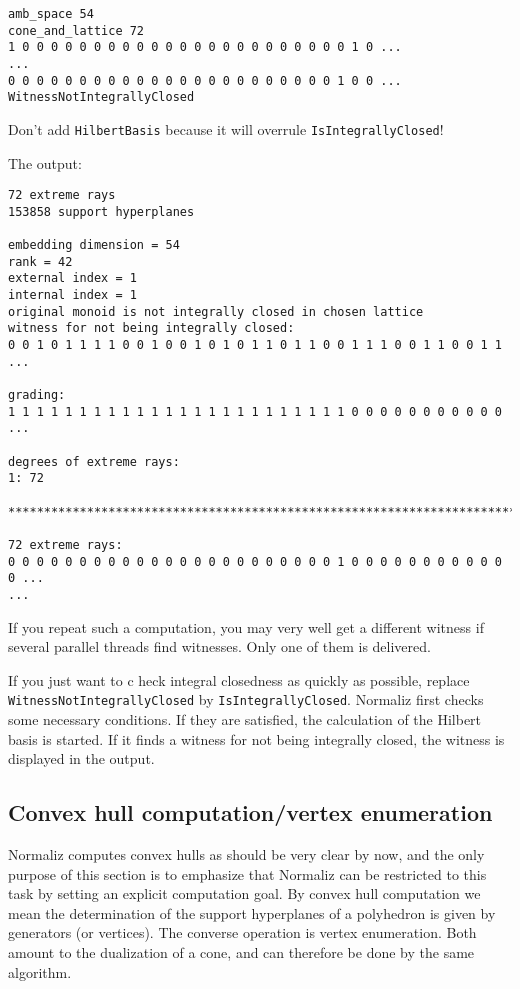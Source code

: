 \documentclass[12pt,a4paper]{scrartcl}
\theoremstyle{definition}
\begin{document}
\begin{Verbatim}
amb_space 54
cone_and_lattice 72
1 0 0 0 0 0 0 0 0 0 0 0 0 0 0 0 0 0 0 0 0 0 0 0 1 0 ...
...
0 0 0 0 0 0 0 0 0 0 0 0 0 0 0 0 0 0 0 0 0 0 0 1 0 0 ...
WitnessNotIntegrallyClosed
\end{Verbatim}
Don't add \verb|HilbertBasis| because it will overrule \verb|IsIntegrallyClosed|!

The output:
\begin{Verbatim}
72 extreme rays
153858 support hyperplanes

embedding dimension = 54
rank = 42
external index = 1
internal index = 1
original monoid is not integrally closed in chosen lattice
witness for not being integrally closed:
0 0 1 0 1 1 1 1 0 0 1 0 0 1 0 1 0 1 1 0 1 1 0 0 1 1 1 0 0 1 1 0 0 1 1 ...

grading:
1 1 1 1 1 1 1 1 1 1 1 1 1 1 1 1 1 1 1 1 1 1 1 1 0 0 0 0 0 0 0 0 0 0 0 ...

degrees of extreme rays:
1: 72  

***********************************************************************

72 extreme rays:
0 0 0 0 0 0 0 0 0 0 0 0 0 0 0 0 0 0 0 0 0 0 0 1 0 0 0 0 0 0 0 0 0 0 0 0 ...
...
\end{Verbatim}

If you repeat such a computation, you may very well get a different witness if several parallel threads find witnesses. Only one of them is delivered.

If you just want to c heck integral closedness as quickly as possible, replace \verb|WitnessNotIntegrallyClosed| by \verb|IsIntegrallyClosed|. Normaliz first checks some necessary conditions. If they are satisfied, the calculation of the Hilbert basis is started. If it finds a witness for not being integrally closed, the witness is displayed in the output.
\subsection{Convex hull computation/vertex enumeration}

Normaliz computes convex hulls as should be very clear by now, and the only purpose of this section is to emphasize that Normaliz can be restricted to this task by setting an explicit computation goal. By convex hull computation we mean the determination of the support hyperplanes of a polyhedron is given by generators (or vertices). The converse operation is vertex enumeration. Both amount to the dualization of a cone, and can therefore be done by the same algorithm.
\end{document}
